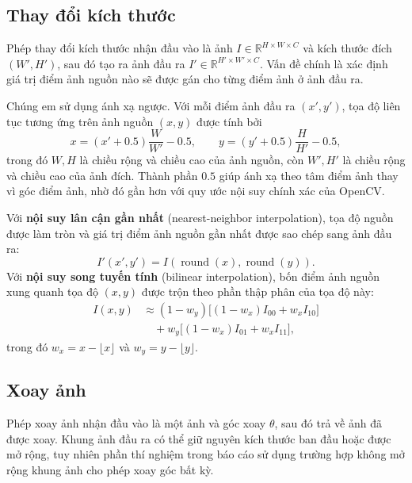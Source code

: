 \documentclass[12pt]{article}
\numberwithin{equation}{section}
\begin{document}
\subsection{Thay đổi kích thước}

Phép thay đổi kích thước nhận đầu vào là ảnh
$I\in\mathbb{R}^{H\times W\times C}$ và kích thước đích $(W',H')$, sau đó tạo ra
ảnh đầu ra $I'\in\mathbb{R}^{H'\times W'\times C}$. Vấn đề chính là xác định giá
trị điểm ảnh nguồn nào sẽ được gán cho từng điểm ảnh ở ảnh đầu ra.

Chúng em sử dụng ánh xạ ngược. Với mỗi điểm ảnh đầu ra $(x',y')$, tọa độ liên
tục tương ứng trên ảnh nguồn $(x,y)$ được tính bởi
\begin{equation}
x = (x' + 0.5)\frac{W}{W'} - 0.5, \qquad
y = (y' + 0.5)\frac{H}{H'} - 0.5,
\label{eq:resize-map}
\end{equation}
trong đó $W,H$ là chiều rộng và chiều cao của ảnh nguồn, còn $W',H'$ là chiều
rộng và chiều cao của ảnh đích. Thành phần $0.5$ giúp ánh xạ theo tâm điểm ảnh
thay vì góc điểm ảnh, nhờ đó gần hơn với quy ước nội suy chính xác của OpenCV.

Với \textbf{nội suy lân cận gần nhất} (nearest-neighbor interpolation), tọa độ nguồn được làm tròn và giá trị
điểm ảnh nguồn gần nhất được sao chép sang ảnh đầu ra:
\begin{equation}
I'(x',y') = I(\operatorname{round}(x), \operatorname{round}(y)).
\end{equation}
Với \textbf{nội suy song tuyến tính} (bilinear interpolation), bốn điểm ảnh nguồn xung quanh tọa độ
$(x,y)$ được trộn theo phần thập phân của tọa độ này:
\begin{equation}
\begin{aligned}
I(x,y) &\approx (1-w_y)\big[(1-w_x)I_{00}+w_xI_{10}\big] \\
       &\quad + w_y\big[(1-w_x)I_{01}+w_xI_{11}\big],
\end{aligned}
\label{eq:bilinear}
\end{equation}
trong đó $w_x=x-\lfloor x\rfloor$ và $w_y=y-\lfloor y\rfloor$.

\subsection{Xoay ảnh}

Phép xoay ảnh nhận đầu vào là một ảnh và góc xoay $\theta$, sau đó trả về ảnh đã
được xoay. Khung ảnh đầu ra có thể giữ nguyên kích thước ban đầu hoặc được mở
rộng, tuy nhiên phần thí nghiệm trong báo cáo sử dụng trường hợp không mở rộng
khung ảnh cho phép xoay góc bất kỳ.
\end{document}
